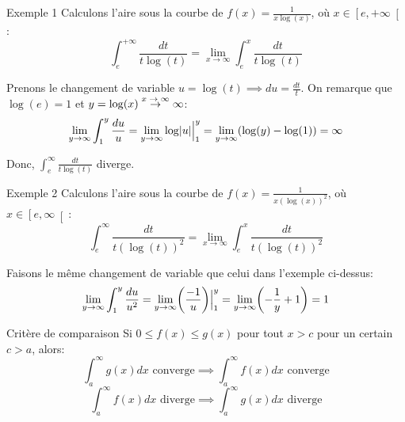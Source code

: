 \documentclass[a4paper]{article}
\begin{document}
\begin{parag}{Exemple 1}
    Calculons l'aire sous la courbe de $f\left(x\right) = \frac{1}{x\log\left(x\right)}$, où $x \in \left[e, +\infty\right[ $: 
    \[\int_{e}^{+\infty} \frac{dt}{t\log\left(t\right)} = \lim_{x \to \infty} \int_{e}^{x} \frac{dt}{t\log\left(t\right)}\]
    
    Prenons le changement de variable $u = \log\left(t\right) \implies du = \frac{dt}{t}$. On remarque que $\log\left(e\right) = 1$ et $y = \log\left(x\right) \over{\to}{$x\to\infty$} \infty$: 
    \[\lim_{y \to \infty} \int_{1}^{y} \frac{du}{u} = \lim_{y \to \infty} \log\left|u\right| \eval_{1}^{y} = \lim_{y \to \infty} \left(\log\left(y\right) - \log\left(1\right)\right) = \infty\]

    Donc, $\int_{e}^{\infty} \frac{dt}{t\log\left(t\right)}$ diverge.
\end{parag}

\begin{parag}{Exemple 2}
    Calculons l'aire sous la courbe de $f\left(x\right) = \frac{1}{x\left(\log\left(x\right)\right)^2}$, où $x \in \left[e, \infty\right[ $: 
        \[\int_{e}^{\infty} \frac{dt}{t\left(\log\left(t\right)\right)^2} = \lim_{x \to \infty} \int_{e}^{x} \frac{dt}{t\left(\log\left(t\right)\right)^2}\]

    Faisons le même changement de variable que celui dans l'exemple ci-dessus:
    \[\lim_{y \to \infty} \int_{1}^{y} \frac{du}{u^2} = \lim_{y \to \infty} \left(\frac{-1}{u}\right)\eval_{1}^{y} = \lim_{y \to \infty} \left(- \frac{1}{y} + 1\right) = 1\]
\end{parag}

\begin{parag}{Critère de comparaison}
    Si $0 \leq f\left(x\right) \leq g\left(x\right)$ pour tout $x > c$ pour un certain $c > a$, alors: 
    \[\int_{a}^{\infty} g\left(x\right)dx \text{ converge} \implies \int_{a}^{\infty} f\left(x\right)dx \text{ converge}\]
    \[\int_{a}^{\infty} f\left(x\right)dx \text{ diverge} \implies \int_{a}^{\infty} g\left(x\right)dx \text{ diverge}\]
\end{parag}
\end{document}
